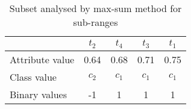 \begin{table}[h]
\caption{Subset analysed by max-sum method for sub-ranges}
\label{table:table2_4}
\centering
\begin{tabular}{lcccc}
	\toprule
	\textbf{} & \textbf{$\mathit{t_2}$}   & \textbf{$\mathit{t_4}$} & \textbf{$\mathit{t_3}$} & \textbf{$\mathit{t_1}$} \\
	\midrule
	Attribute value & 0.64 & 0.68 & 0.71 & 0.75 \\
	Class value & ${c_2}$ & ${c_1}$ & ${c_1}$ & ${c_1}$ \\
	Binary values & -1 & 1 & 1 & 1 \\
	\bottomrule
\end{tabular} 
\end{table}
